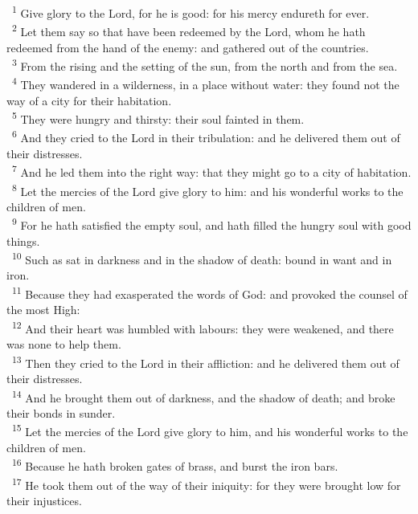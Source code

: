 \documentclass[a5paper,12pt]{article}
\begin{document}
\begin{multicols*}{2}
~\textsuperscript{1} Give glory to the Lord, for he is good: for his mercy endureth for ever.\\
~\textsuperscript{2} Let them say so that have been redeemed by the Lord, whom he hath redeemed from the hand of the enemy: and gathered out of the countries.\\
~\textsuperscript{3} From the rising and the setting of the sun, from the north and from the sea.\\
~\textsuperscript{4} They wandered in a wilderness, in a place without water: they found not the way of a city for their habitation.\\
~\textsuperscript{5} They were hungry and thirsty: their soul fainted in them.\\
~\textsuperscript{6} And they cried to the Lord in their tribulation: and he delivered them out of their distresses.\\
~\textsuperscript{7} And he led them into the right way: that they might go to a city of habitation.\\
~\textsuperscript{8} Let the mercies of the Lord give glory to him: and his wonderful works to the children of men.\\
~\textsuperscript{9} For he hath satisfied the empty soul, and hath filled the hungry soul with good things.\\
~\textsuperscript{10} Such as sat in darkness and in the shadow of death: bound in want and in iron.\\
~\textsuperscript{11} Because they had exasperated the words of God: and provoked the counsel of the most High:\\
~\textsuperscript{12} And their heart was humbled with labours: they were weakened, and there was none to help them.\\
~\textsuperscript{13} Then they cried to the Lord in their affliction: and he delivered them out of their distresses.\\
~\textsuperscript{14} And he brought them out of darkness, and the shadow of death; and broke their bonds in sunder.\\
~\textsuperscript{15} Let the mercies of the Lord give glory to him, and his wonderful works to the children of men.\\
~\textsuperscript{16} Because he hath broken gates of brass, and burst the iron bars.\\
~\textsuperscript{17} He took them out of the way of their iniquity: for they were brought low for their injustices.\\

\end{multicols*}
\end{document}
